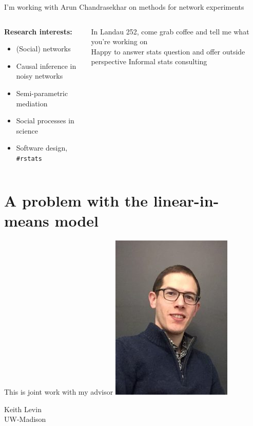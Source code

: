 \documentclass[aspectratio=169]{beamer}
\theoremstyle{remark}
\begin{document}
\begin{frame}{I'm working with Arun Chandrasekhar on methods for network experiments}
    \begin{columns}
        \begin{column}{0.5\textwidth}
            \textbf{Research interests:}
            \begin{itemize}
                \item (Social) networks
                \item Causal inference in noisy networks
                \item Semi-parametric mediation
                \item Social processes in science
                \item Software design, \texttt{\#rstats}
            \end{itemize}
        \end{column}
        \begin{column}{0.5\textwidth}
            In Landau 252, come grab coffee and tell me what you're working on \\    
            \vspace{3mm}
            Happy to answer stats question and offer outside perspective
            Informal stats consulting
        \end{column}
    \end{columns}
\end{frame}

\section{A problem with the linear-in-means model}

\begin{frame}{This is joint work with my advisor}
    \centering
    \includegraphics[height=0.75\textheight]{./figures/keith.jpg}
    
    Keith Levin \\
    UW-Madison
\end{frame}
\end{document}
